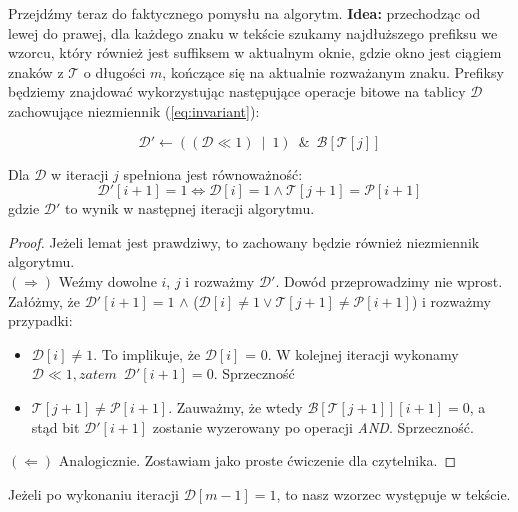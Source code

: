 Przejdźmy teraz do faktycznego pomysłu na algorytm. \textbf{Idea:} przechodząc od lewej do prawej,
dla każdego znaku w tekście szukamy najdłuższego prefiksu we wzorcu, który również jest
suffiksem w aktualnym oknie, gdzie okno jest ciągiem znaków z $\mathcal{T}$ o długości $m$,
kończące się na aktualnie rozważanym znaku. Prefiksy będziemy znajdować wykorzystując następujące
operacje bitowe na tablicy $\mathcal{D}$ zachowujące niezmiennik (\ref{eq:invariant}):

\begin{equation}
    \label{eq:resultUpdate}
    \mathcal{D'} \leftarrow ((\mathcal{D} \ll 1 ) \enspace | \enspace 1)
        \enspace \& \enspace \mathcal{B}[\mathcal{T}[j]]
\end{equation}

\begin{lemma}
    Dla $\mathcal{D}$ w iteracji $j$ spełniona jest równoważność:
    $$
        \mathcal{D'}[i+1] = 1 \Leftrightarrow{}
            \mathcal{D}[i] = 1 \wedge{} \mathcal{T}[j+1] = \mathcal{P}[i+1]
    $$
    gdzie $\mathcal{D'}$ to wynik w następnej iteracji algorytmu.
\end{lemma}
\begin{proof}
    Jeżeli lemat jest prawdziwy, to zachowany będzie również niezmiennik algorytmu. \\
    $(\Rightarrow)$
    Weźmy dowolne $i$, $j$ i rozważmy $\mathcal{D'}$. Dowód przeprowadzimy nie wprost.
    Załóżmy, że
        $\mathcal{D'}[i+1] = 1$
    $\wedge$
        ($\mathcal{D}[i] \neq 1 \vee{} \mathcal{T}[j+1] \neq \mathcal{P}[i+1]$)
    i rozważmy przypadki:
    \begin{itemize}
        \item $\mathcal{D}[i] \neq 1$. To implikuje, że $\mathcal{D}[i]$ = 0.
           W kolejnej iteracji wykonamy
           $\mathcal{D} \ll 1, zatem \enspace \mathcal{D'}[i+1] = 0$. Sprzeczność
        \item $\mathcal{T}[j+1] \neq \mathcal{P}[i+1]$.
            Zauważmy, że wtedy $\mathcal{B}[\mathcal{T}[j+1]][i+1] = 0$,
            a stąd bit $\mathcal{D'}[i+1]$ zostanie wyzerowany po operacji \textit{AND}. Sprzeczność.

    \end{itemize}
    $(\Leftarrow)$
    Analogicznie. Zostawiam jako proste ćwiczenie dla czytelnika.
\end{proof}

\begin{observation}
Jeżeli po wykonaniu iteracji $\mathcal{D}[m-1] = 1$, to nasz wzorzec występuje w tekście.
\end{observation}

